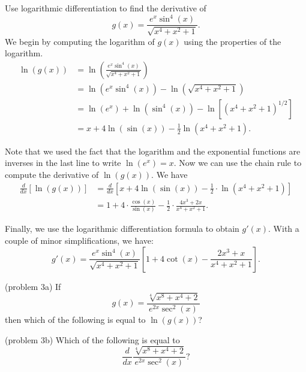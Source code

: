\documentclass[handout]{ximera}
\begin{document}
\begin{example}[example 3]
Use logarithmic differentiation to find the derivative of 
\[
g(x) = \frac{e^x \sin^4(x)}{\sqrt{x^4 + x^2 + 1}}.
\]
We begin by computing the logarithm of $g(x)$ using the properties of the logarithm.
\begin{align*}
\ln(g(x)) &= \ln\left(\frac{e^x \sin^4(x)}{\sqrt{x^4 + x^2 + 1}}\right)\\
&= \ln\left(e^x \sin^4(x)\right) - \ln\left(\sqrt{x^4 + x^2 + 1}\right)\\
&= \ln(e^x) + \ln(\sin^4(x)) - \ln[(x^4 + x^2 + 1)^{1/2}]\\
&= x + 4\ln(\sin(x)) - \frac12 \ln(x^4 + x^2 + 1).
\end{align*}

Note that we used the fact that the logarithm and the exponential functions are 
inverses in the last line
to write $\ln(e^x) = x$.
Now we can use the chain rule to compute the derivative of $\ln(g(x))$.
We have
\begin{align*}
\frac{d}{dx}\left[ \ln(g(x))\right] &= \frac{d}{dx}\left[ x + 4\ln(\sin(x)) - \frac12 \cdot \ln(x^4 + x^2 + 1)\right]\\
&= 1+ 4 \cdot \frac{\cos(x)}{\sin(x)} - \frac12 \cdot \frac{4x^3 + 2x}{x^4 + x^2 + 1}.
\end{align*}


Finally, we use the logarithmic differentiation formula to obtain $g'(x)$.
With a couple of minor simplifications, we have:
\[
g'(x) = \frac{e^x \sin^4(x)}{\sqrt{x^4 + x^2 + 1}} \left[1+ 4 \cot(x) - 
 \frac{2x^3 + x}{x^4 + x^2 + 1}\right].
\]

\end{example}

\begin{problem}(problem 3a)
  If 
	\[
	g(x) = \frac{\sqrt[4]{x^8 + x^4 + 2}}{e^{2x} \sec^2(x)}
	\]
	then which of the following is equal to $\ln(g(x))$?
  \begin{multipleChoice}
  \end{multipleChoice}
\end{problem}



\begin{problem}(problem 3b)
  Which of the following is equal to 
  \[
  \frac{d}{dx} \frac{\sqrt[4]{x^8 + x^4 + 2}}{e^{2x} \sec^2(x)}?
  \]

  \begin{multipleChoice}
  \end{multipleChoice}
   
		
\end{problem}
\end{document}
